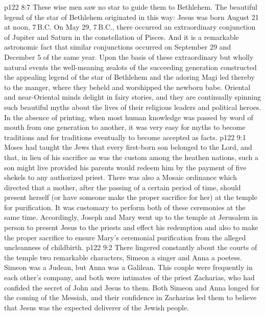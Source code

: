 \vs p122 8:7 These wise men saw no star to guide them to Bethlehem. The beautiful legend of the star of Bethlehem originated in this way: Jesus was born August 21 at noon, 7\,B.C. On May 29, 7\,B.C., there occurred an extraordinary conjunction of Jupiter and Saturn in the constellation of Pisces. And it is a remarkable astronomic fact that similar conjunctions occurred on September 29 and December 5 of the same year. Upon the basis of these extraordinary but wholly natural events the well\hyp{}meaning zealots of the succeeding generation constructed the appealing legend of the star of Bethlehem and the adoring Magi led thereby to the manger, where they beheld and worshipped the newborn babe. Oriental and near\hyp{}Oriental minds delight in fairy stories, and they are continually spinning such beautiful myths about the lives of their religious leaders and political heroes. In the absence of printing, when most human knowledge was passed by word of mouth from one generation to another, it was very easy for myths to become traditions and for traditions eventually to become accepted as facts.
\vs p122 9:1 Moses had taught the Jews that every first\hyp{}born son belonged to the Lord, and that, in lieu of his sacrifice as was the custom among the heathen nations, such a son might live provided his parents would redeem him by the payment of five shekels to any authorized priest. There was also a Mosaic ordinance which directed that a mother, after the passing of a certain period of time, should present herself (or have someone make the proper sacrifice for her) at the temple for purification. It was customary to perform both of these ceremonies at the same time. Accordingly, Joseph and Mary went up to the temple at Jerusalem in person to present Jesus to the priests and effect his redemption and also to make the proper sacrifice to ensure Mary’s ceremonial purification from the alleged uncleanness of childbirth.
\vs p122 9:2 \pc There lingered constantly about the courts of the temple two remarkable characters, Simeon a singer and Anna a poetess. Simeon was a Judean, but Anna was a Galilean. This couple were frequently in each other’s company, and both were intimates of the priest Zacharias, who had confided the secret of John and Jesus to them. Both Simeon and Anna longed for the coming of the Messiah, and their confidence in Zacharias led them to believe that Jesus was the expected deliverer of the Jewish people.
